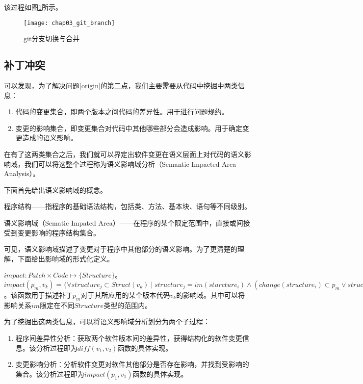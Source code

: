 该过程如图\ref{git_branch}所示。

\begin{figure}[H]	
	\centering
	\texttt{[image: chap03\_git\_branch]}
	\caption {git分支切换与合并}	
	\label {git_branch}
\end{figure}


\subsection{补丁冲突}
\label {conflict}

可以发现，为了解决问题\ref {origin}的第二点，我们主要需要从代码中挖掘中两类信息：
\begin{enumerate}
	\item 代码的变更集合，即两个版本之间代码的差异性。用于进行问题规约。
	\item 变更的影响集合，即变更集合对代码中其他哪些部分会造成影响。用于确定变更造成的语义影响。
\end{enumerate}

在有了这两类集合之后，我们就可以界定出软件变更在语义层面上对代码的语义影响域，我们可以将这整个过程称为语义影响域分析（Semantic Impacted Area Analysis）。

下面首先给出语义影响域的概念。

\begin{definition}
	程序结构——指程序的基础语法结构，包括类、方法、基本块、语句等不同级别。
\end{definition}

\begin{definition}
	语义影响域（Sematic Impated Area）——在程序的某个限定范围中，直接或间接受到变更影响的程序结构集合。
\end{definition}

可见，语义影响域描述了变更对于程序中其他部分的语义影响。为了更清楚的理解，下面给出影响域的形式化定义。

\begin{definition}
	$impact: Patch \times Code \mapsto \{Structure\}$。$impact(p_m, v_k) = \{ \forall structure_j \subset Struct(v_k) \mid structure_j = im(sturcture_i) \land (change(structure_i) \subset p_m \lor structure_i \subset impact(p_m,v_k)),structure_i,structure_j \subset Struct(v_k),v_k \subset Code,p_m \subset Pat(v_k), i,j,k,m \subset \mathbb{N} \}$。该函数用于描述补丁$p_m$对于其所应用的某个版本代码$v_k$的影响域。其中可以将影响关系$im$限定在不同$Structure$类型的范围内。
\end{definition}

为了挖掘出这两类信息，可以将语义影响域分析划分为两个子过程：
\begin{enumerate}
	\item 程序间差异性分析：获取两个软件版本间的差异性，获得结构化的软件变更信息。该分析过程即为$diff(v_1,v_2)$函数的具体实现。
	\item 变更影响分析：分析软件变更对软件其他部分是否存在影响，并找到受影响的集合。该分析过程即为$impact(p_1,v_1)$函数的具体实现。
\end{enumerate}

